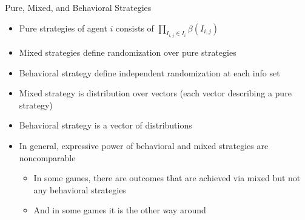 \documentclass[11pt,aspectratio=169,handout]{beamer}
\begin{document}
  \begin{frame}{Pure, Mixed, and Behavioral Strategies}
   \begin{itemize}[<+->]
   \setlength{\itemsep}{1em}
    \item \alert{Pure strategies} of agent $i$ consists of $\prod_{I_{i,j} \in I_i} \beta(I_{i,j})$
    \item \alert{Mixed strategies} define randomization over pure strategies
    \item \alert{Behavioral strategy} define independent randomization at each info set
    \item Mixed strategy is \alert{distribution over vectors} (each vector describing a pure strategy)
    \item Behavioral strategy is a \alert{vector of distributions}
    \item In general, expressive power of behavioral and mixed strategies are noncomparable
    \begin{itemize}
     \item In some games, there are outcomes that are achieved via mixed but not any behavioral strategies
     \item And in some games it is the other way around
    \end{itemize}
   \end{itemize}
  \end{frame}
  
\end{document}
